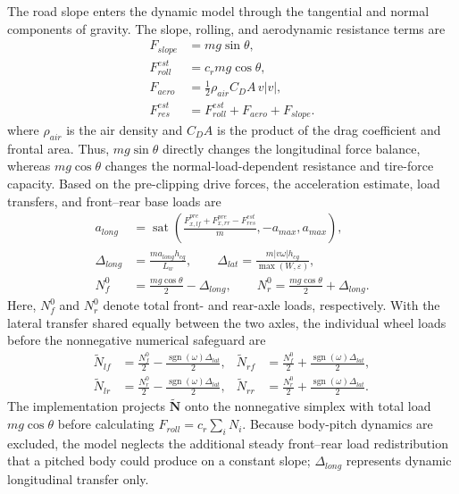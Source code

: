 \documentclass{ieeeaccess}
\begin{document}
The road slope enters the dynamic model through the tangential and normal components of gravity. The slope, rolling, and aerodynamic resistance terms are
\begin{equation}
\begin{aligned}
F_{slope}&=mg\sin\theta,\\
F_{roll}^{est}&=c_rmg\cos\theta,\\
F_{aero}&=\frac{1}{2}\rho_{air}C_DA\,v|v|,\\
F_{res}^{est}&=F_{roll}^{est}+F_{aero}+F_{slope}.
\end{aligned}
\label{eq:agv_slope_resistance}
\end{equation}
where $\rho_{air}$ is the air density and $C_DA$ is the product of the drag coefficient and frontal area. Thus, $mg\sin\theta$ directly changes the longitudinal force balance, whereas $mg\cos\theta$ changes the normal-load-dependent resistance and tire-force capacity. Based on the pre-clipping drive forces, the acceleration estimate, load transfers, and front--rear base loads are
\begin{equation}
\begin{aligned}
a_{long}&=\operatorname{sat}\!\left(
\frac{F_{x,lf}^{pre}+F_{x,rr}^{pre}-F_{res}^{est}}{m},-a_{max},a_{max}\right),\\
\Delta_{long}&=\frac{ma_{long}h_{cg}}{L_w},\qquad
\Delta_{lat}=\frac{m|v\omega|h_{cg}}{\max(W,\varepsilon)},\\
N_f^0&=\frac{mg\cos\theta}{2}-\Delta_{long},\qquad
N_r^0=\frac{mg\cos\theta}{2}+\Delta_{long}.
\end{aligned}
\label{eq:agv_load_transfer}
\end{equation}
Here, $N_f^0$ and $N_r^0$ denote total front- and rear-axle loads, respectively. With the lateral transfer shared equally between the two axles, the individual wheel loads before the nonnegative numerical safeguard are
\begin{equation}
\begin{aligned}
\widetilde N_{lf}&=\frac{N_f^0}{2}-\frac{\operatorname{sgn}(\omega)\Delta_{lat}}{2},&
\widetilde N_{rf}&=\frac{N_f^0}{2}+\frac{\operatorname{sgn}(\omega)\Delta_{lat}}{2},\\
\widetilde N_{lr}&=\frac{N_r^0}{2}-\frac{\operatorname{sgn}(\omega)\Delta_{lat}}{2},&
\widetilde N_{rr}&=\frac{N_r^0}{2}+\frac{\operatorname{sgn}(\omega)\Delta_{lat}}{2}.
\end{aligned}
\label{eq:agv_wheel_load_distribution}
\end{equation}
The implementation projects $\widetilde{\bm N}$ onto the nonnegative simplex with total load $mg\cos\theta$ before calculating $F_{roll}=c_r\sum_iN_i$. Because body-pitch dynamics are excluded, the model neglects the additional steady front--rear load redistribution that a pitched body could produce on a constant slope; $\Delta_{long}$ represents dynamic longitudinal transfer only.
\end{document}
